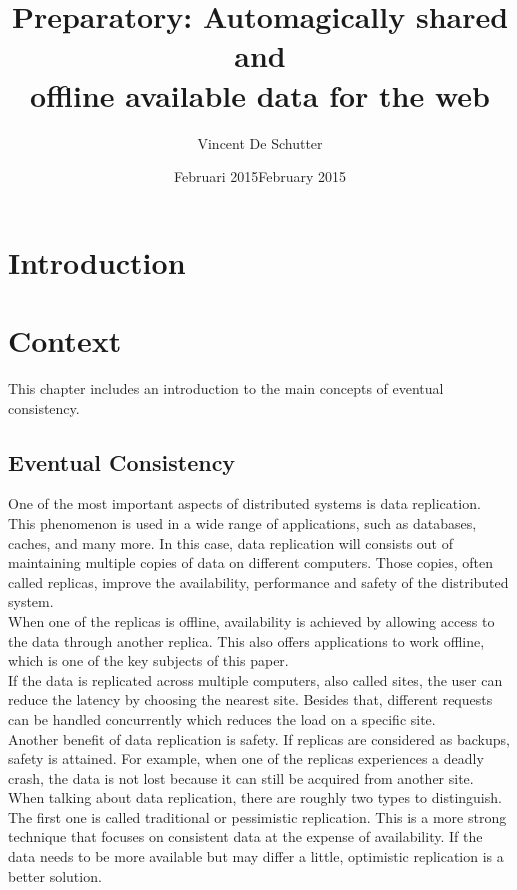 \documentclass[a4paper,12pt]{report}
\author{Vincent De Schutter}
\title{Preparatory: Automagically shared and \\offline available data for the web}
\date{Februari 2015}
\begin{document}


\date{February 2015}

\maketitlepage

\tableofcontents
\newpage

\chapter{Introduction}\label{cha:Introduction} %
\chapter{Context}\label{cha:Context} %

This chapter includes an introduction to the main concepts of eventual consistency. 

\section{Eventual Consistency}\label{sec:EventualConsistency}

One of the most important aspects of distributed systems is data replication. This phenomenon is used in a wide range of applications, such as databases, caches, and many more. In this case, data replication will consists out of maintaining multiple copies of data on different computers. Those copies, often called replicas, improve the availability, performance and safety of the distributed system. \\
When one of the replicas is offline, availability is achieved by allowing access to the data through another replica. This also offers applications to work offline, which is one of the key subjects of this paper. \\
If the data is replicated across multiple computers, also called sites, the user can reduce the latency by choosing the nearest site. Besides that, different requests can be handled concurrently which reduces the load on a specific site. \\
Another benefit of data replication is safety. If replicas are considered as backups, safety is attained. For example, when one of the replicas experiences a deadly crash, the data is not lost because it can still be acquired from another site.\\
\newline
When talking about data replication, there are roughly two types to distinguish. The first one is called traditional or pessimistic replication. This is a more strong technique that focuses on consistent data at the expense of availability. If the data needs to be more available but may differ a little, optimistic replication is a better solution.
\end{document}
